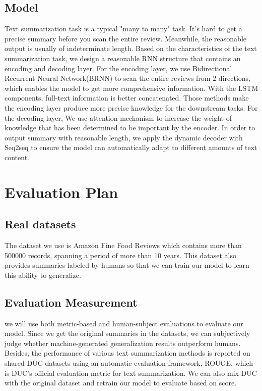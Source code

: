 \documentclass[conference]{IEEEtran}
\begin{document}
\subsection{Model}
Text summarization task is a typical "many to many" task. It's hard to get a precise summary before you scan the entire review. Meanwhile, the reasonable output is usually of indeterminate length. Based on the characteristics of the text summarization task, we design a reasonable RNN structure that contains an encoding and decoding layer. For the encoding layer, we use Bidirectional Recurrent Neural Network(BRNN) to scan the entire reviews from 2 directions, which enables the model to get more comprehensive information. With the LSTM components, full-text information is better concatenated. Those methods make the encoding layer produce more precise knowledge for the downstream tasks. For the decoding layer, We use attention mechanism to increase the weight of knowledge that has been determined to be important by the encoder. In order to output summary with reasonable length, we apply the dynamic decoder with Seq2seq to ensure the model can automatically adapt to different amounts of text content.

\section{Evaluation Plan}
\subsection{Real datasets}
The dataset we use is Amazon Fine Food Reviews which contains more than 500000 records, spanning a period of more than 10 years. This dataset also provides summaries labeled by humans so that we can train our model to learn this ability to generalize. 
\subsection{Evaluation Measurement}
we will use both metric-based and human-subject evaluations to evaluate our model. Since we get the original summaries in the datasets, we can subjectively judge whether machine-generated generalization results outperform humans.  Besides, the performance of various text summarization methods is reported on shared DUC datasets using an automatic evaluation framework, ROUGE, which is DUC’s official evaluation metric for text summarization. We can also mix DUC with the original dataset and retrain our model to evaluate based on score.


\end{document}
